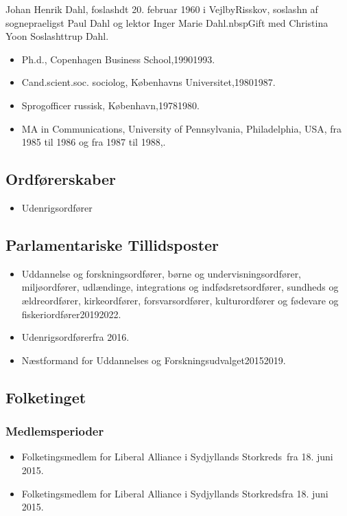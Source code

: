 \documentclass[11pt, a4paper]{awesome-cv}
\begin{document}
\makecvheader[R]
\makelettertitle
\begin{cvletter}
Johan Henrik Dahl, foslashdt 20. februar 1960 i VejlbyRisskov, soslashn af sognepraeligst Paul Dahl og lektor Inger Marie Dahl.nbspGift med Christina Yoon Soslashttrup Dahl.

\begin{itemize}
\item Ph.d., Copenhagen Business School,19901993.
\item Cand.scient.soc. sociolog, Københavns Universitet,19801987.
\item Sprogofficer russisk, København,19781980.
\item MA in Communications, University of Pennsylvania, Philadelphia, USA, fra 1985 til 1986 og fra 1987 til 1988,.
\end{itemize}
\subsection*{Ordførerskaber}
\begin{itemize}
\item Udenrigsordfører
\end{itemize}
\subsection*{Parlamentariske Tillidsposter}
\begin{itemize}
\item Uddannelse og forskningsordfører, børne og undervisningsordfører,  miljøordfører, udlændinge, integrations og indfødsretsordfører, sundheds og ældreordfører, kirkeordfører, forsvarsordfører, kulturordfører og fødevare og fiskeriordfører20192022.
\item Udenrigsordførerfra 2016.
\item Næstformand for Uddannelses og Forskningsudvalget20152019.
\end{itemize}
\subsection*{Folketinget}
\subsubsection*{Medlemsperioder}
\begin{itemize}
\item Folketingsmedlem for Liberal Alliance i Sydjyllands Storkreds fra 18. juni 2015.
\item Folketingsmedlem for Liberal Alliance i Sydjyllands Storkredsfra 18. juni 2015.
\end{itemize}

\end{cvletter}
\end{document}
